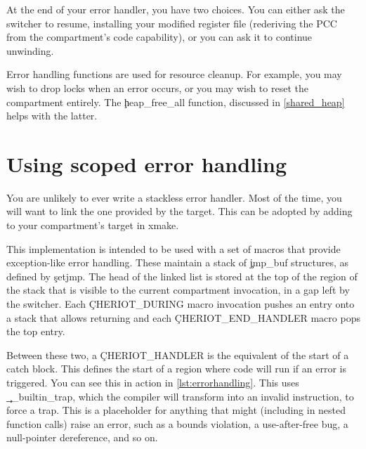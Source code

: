 At the end of your error handler, you have two choices.
You can either ask the switcher to resume, installing your modified register file (rederiving the PCC from the compartment's code capability), or you can ask it to continue unwinding.

Error handling functions are used for resource cleanup.
For example, you may wish to drop locks when an error occurs, or you may wish to reset the compartment entirely.
The \c{heap_free_all} function, discussed in \ref{shared_heap} helps with the latter.

\section{Using scoped error handling}

You are unlikely to ever write a stackless error handler.
Most of the time, you will want to link the one provided by the  target.
This can be adopted by adding  to your compartment's target in xmake.

This implementation is intended to be used with a set of macros that provide exception-like error handling.
These maintain a stack of \c{jmp_buf} structures, as defined by \c{setjmp}.
The head of the linked list is stored at the top of the region of the stack that is visible to the current compartment invocation, in a gap left by the switcher.
Each \c{CHERIOT_DURING} macro invocation pushes an entry onto a stack that allows returning and each \c{CHERIOT_END_HANDLER} macro pops the top entry.


Between these two, a \c{CHERIOT_HANDLER} is the equivalent of the start of a catch block.
This defines the start of a region where code will run if an error is triggered.
You can see this in action in \ref{lst:errorhandling}.
This uses \c{__builtin_trap}, which the compiler will transform into an invalid instruction, to force a trap.
This is a placeholder for anything that might (including in nested function calls) raise an error, such as a bounds violation, a use-after-free bug, a null-pointer dereference, and so on.


\codelisting[marker=error,caption=Example of using scoped error handling,label=lst:errorhandling, filename=examples/error_handling/errors.cc]{}

